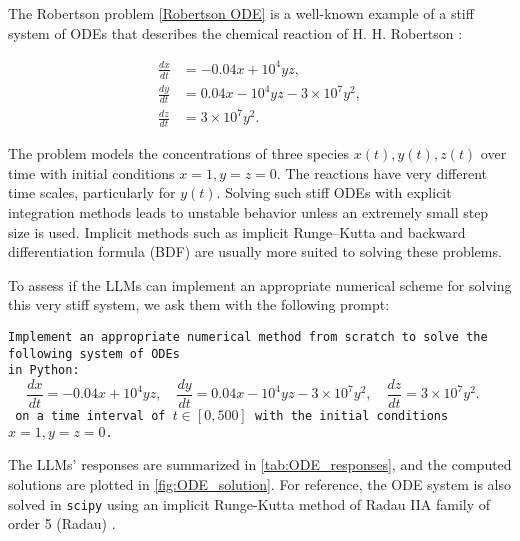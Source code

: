 \documentclass{article}
\begin{document}
The Robertson problem \autoref{Robertson ODE} is a well-known example of a stiff system of ODEs that describes the chemical reaction of H. H. Robertson \cite{robertson1966solution}: 

\begin{align}
    \frac{dx}{dt} & = -0.04x + 10^4 yz, \nonumber \\ 
\frac{dy}{dt} & = 0.04x - 10^4 yz - 3 \times 10^7 y^2, \label{Robertson ODE} \\
\frac{dz}{dt} & = 3 \times 10^7 y^2. \nonumber
\end{align}

The problem models the concentrations of three species $x(t), y(t), z(t)$ over time with initial conditions $x=1, y=z=0$. The reactions have very different time scales, particularly for $y(t)$. Solving such stiff ODEs with explicit integration methods leads to unstable behavior unless an extremely small step size is used. Implicit methods such as implicit Runge–Kutta and backward differentiation formula (BDF) are usually more suited to solving these problems. 

To assess if the LLMs can implement an appropriate numerical scheme for solving this very stiff system, we ask them with the following prompt:

\texttt{Implement an appropriate numerical method from scratch to solve the following system of ODEs  \\ in Python: 
$$
\frac{dx}{dt} = -0.04x + 10^4 yz, \quad 
\frac{dy}{dt} = 0.04x - 10^4 yz - 3 \times 10^7 y^2,\quad
\frac{dz}{dt} = 3 \times 10^7 y^2. \quad
$$
on a time interval of $t \in [0, 500]$ with the initial conditions $x=1, y=z=0$. }

The LLMs' responses are summarized in \autoref{tab:ODE_responses}, and the computed solutions are plotted in \autoref{fig:ODE_solution}.  For reference, the ODE system is also solved in \texttt{scipy} using an implicit Runge-Kutta method of Radau IIA family of order 5 (Radau) \cite{hairer1991ii}. 
\end{document}
